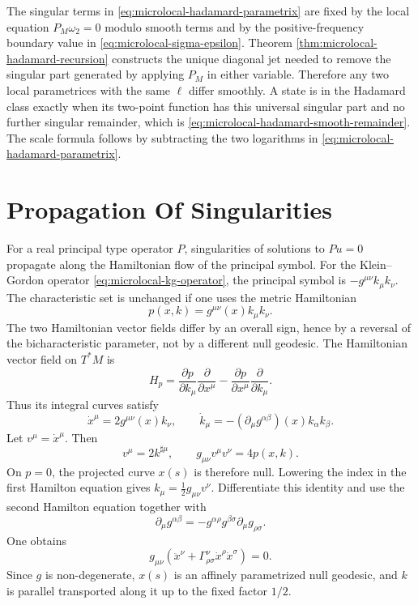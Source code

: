 The singular terms in \eqref{eq:microlocal-hadamard-parametrix} are fixed by
the local equation \(P_M\omega_2=0\) modulo smooth terms and by the
positive-frequency boundary value in
\eqref{eq:microlocal-sigma-epsilon}.  Theorem
\ref{thm:microlocal-hadamard-recursion} constructs the unique diagonal jet
needed to remove the singular part generated by applying \(P_M\) in either
variable.  Therefore any two local parametrices with the same \(\ell\) differ
smoothly.  A state is in the Hadamard class exactly when its two-point
function has this universal singular part and no further singular remainder,
which is \eqref{eq:microlocal-hadamard-smooth-remainder}.  The scale formula
follows by subtracting the two logarithms in
\eqref{eq:microlocal-hadamard-parametrix}.

\section{Propagation Of Singularities}

For a real principal type operator \(P\), singularities of solutions to
\(Pu=0\) propagate along the Hamiltonian flow of the principal symbol.  For
the Klein--Gordon operator \eqref{eq:microlocal-kg-operator}, the principal
symbol is \(-g^{\mu\nu}k_\mu k_\nu\).  The characteristic set is unchanged if
one uses the metric Hamiltonian
\[
  p(x,k)=g^{\mu\nu}(x)k_\mu k_\nu .
\]
The two Hamiltonian vector fields differ by an overall sign, hence by a
reversal of the bicharacteristic parameter, not by a different null geodesic.
The Hamiltonian vector field on \(T^*M\) is
\[
  H_p
  =
  \frac{\partial p}{\partial k_\mu}\frac{\partial}{\partial x^\mu}
  -
  \frac{\partial p}{\partial x^\mu}\frac{\partial}{\partial k_\mu}.
\]
Thus its integral curves satisfy
\begin{equation}
  \dot x^\mu=2g^{\mu\nu}(x)k_\nu,
  \qquad
  \dot k_\mu=-(\partial_\mu g^{\alpha\beta})(x)k_\alpha k_\beta .
  \label{eq:microlocal-kg-hamilton-equations}
\end{equation}
Let \(v^\mu=\dot x^\mu\).  Then
\[
  v^\mu=2k^{\sharp\mu},
  \qquad
  g_{\mu\nu}v^\mu v^\nu=4p(x,k).
\]
On \(p=0\), the projected curve \(x(s)\) is therefore null.  Lowering the
index in the first Hamilton equation gives \(k_\mu=\frac12g_{\mu\nu}v^\nu\).
Differentiate this identity and use the second Hamilton equation together
with
\[
  \partial_\mu g^{\alpha\beta}
  =
  -g^{\alpha\rho}g^{\beta\sigma}\partial_\mu g_{\rho\sigma}.
\]
One obtains
\[
  g_{\mu\nu}\left(\ddot x^\nu+\Gamma^\nu_{\rho\sigma}
       \dot x^\rho\dot x^\sigma\right)=0 .
\]
Since \(g\) is non-degenerate, \(x(s)\) is an affinely parametrized null
geodesic, and \(k\) is parallel transported along it up to the fixed factor
\(1/2\).

